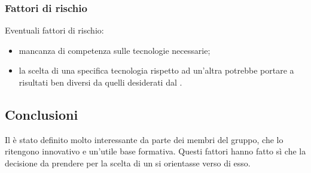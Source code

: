 		\subsubsection {Fattori di rischio}
		Eventuali fattori di rischio:
			\begin {itemize}
				\item mancanza di competenza sulle tecnologie necessarie;
				\item la scelta di una specifica tecnologia rispetto ad un'altra potrebbe portare a risultati ben diversi da quelli desiderati dal .
			\end {itemize}
	\subsection {Conclusioni}
	Il  è stato definito molto interessante da parte dei membri del gruppo, che lo ritengono innovativo e un'utile base formativa. Questi fattori hanno fatto sì che la decisione da prendere per la scelta di un  si orientasse verso di esso.
